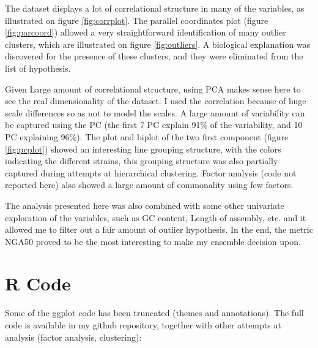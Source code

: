 \documentclass[11pt, a4paper,titlepage]{article}
\begin{document}
The dataset displays a lot of correlational structure in many of the
variables, as illustrated on figure \ref{fig:corrplot}. The parallel
coordinates plot (figure \ref{fig:parcoord}) allowed a very
straightforward identification of many outlier clusters, which are
illustrated on figure \ref{fig:outliers}. A biological explanation was
discovered for the presence of these clusters, and they were
eliminated from the list of hypothesis.

Given Large amount of correlational structure, using PCA makes sense
here to see the real dimensionality of the dataset. I used the
correlation because of huge scale differences so as not to model the
scales. A large amount of variability can be captured using the PC
(the first 7 PC explain 91\% of the variability, and 10 PC explaining
96\%). The plot and biplot of the two first component (figure
\ref{fig:pcplot}) showed an interesting line grouping structure, with
the colors indicating the different strains, this grouping structure
was also partially captured during attempts at hierarchical
clustering. Factor analysis (code not reported here) also showed a
large amount of commonality using few factors.

The analysis presented here was also combined with some other
univariate exploration of the variables, such as GC content, Length of
assembly, etc. and it allowed me to filter out a fair amount of
outlier hypothesis. In the end, the metric NGA50 proved to be the most
interesting to make my ensemble decision upon.

\section{R Code}

Some of the ggplot code has been truncated (themes and
annotations). The full code is available in my github repository,
together with other attempts at analysis (factor analysis,
clustering):
\end{document}

